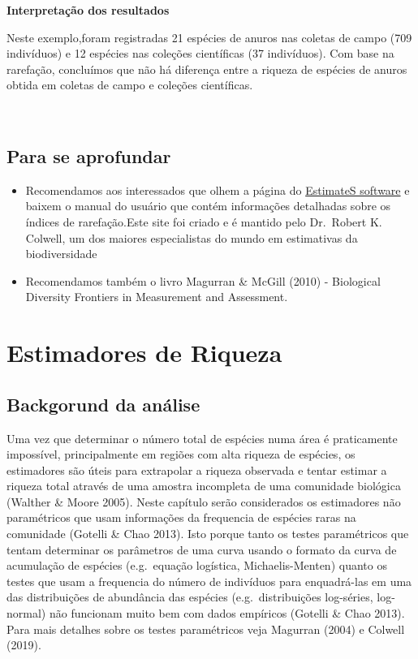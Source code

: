 \documentclass[
]{book}
\begin{document}
\textbf{Interpretação dos resultados}

Neste exemplo,foram registradas 21 espécies de anuros nas coletas de campo (709 indivíduos) e 12 espécies nas coleções científicas (37 indivíduos). Com base na rarefação, concluímos que não há diferença entre a riqueza de espécies de anuros obtida em coletas de campo e coleções científicas.

~

\hypertarget{para-se-aprofundar}{%
\section{Para se aprofundar}\label{para-se-aprofundar}}

\begin{itemize}
\item
  Recomendamos aos interessados que olhem a página do \href{http://viceroy.eeb.uconn.edu/estimates}{EstimateS software} e baixem o manual do usuário que contém informações detalhadas sobre os índices de rarefação.Este site foi criado e é mantido pelo Dr.~Robert K. Colwell, um dos maiores especialistas do mundo em estimativas da biodiversidade
\item
  Recomendamos também o livro Magurran \& McGill (2010) - Biological Diversity Frontiers in Measurement and Assessment.
\end{itemize}

\hypertarget{estimadores-de-riqueza}{%
\chapter{Estimadores de Riqueza}\label{estimadores-de-riqueza}}

\hypertarget{backgorund-da-anuxe1lise}{%
\section{Backgorund da análise}\label{backgorund-da-anuxe1lise}}

Uma vez que determinar o número total de espécies numa área é praticamente impossível, principalmente em regiões com alta riqueza de espécies, os estimadores são úteis para extrapolar a riqueza observada e tentar estimar a riqueza total através de uma amostra incompleta de uma comunidade biológica (Walther \& Moore 2005). Neste capítulo serão considerados os estimadores não paramétricos que usam informações da frequencia de espécies raras na comunidade (Gotelli \& Chao 2013). Isto porque tanto os testes paramétricos que tentam determinar os parâmetros de uma curva usando o formato da curva de acumulação de espécies (e.g.~equação logística, Michaelis-Menten) quanto os testes que usam a frequencia do número de indivíduos para enquadrá-las em uma das distribuições de abundância das espécies (e.g.~distribuições log-séries, log-normal) não funcionam muito bem com dados empíricos (Gotelli \& Chao 2013). Para mais detalhes sobre os testes paramétricos veja Magurran (2004) e Colwell (2019).
\end{document}
